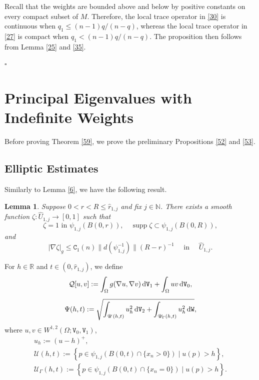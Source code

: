 \documentclass[reqno, 11pt, a4paper]{amsart}
\newtheorem{lemma}[theorem]{Lemma}
\numberwithin{equation}{section}
\newcommand{\ops}{\mathcal{Q}}
\newcommand{\womd}{W^{1,2} (\Omega ; \mathtt{V} _0 , \mathtt{V} _1)}
\newcommand{\spt}{\operatorname{supp}}
\newcommand{\dwv}{\textnormal{d} \mathtt{V}}
\newcommand{\dww}{\textnormal{d} \mathtt{W}}
\newcommand{\pvr}{p}
\newcommand{\qxp}{q}
\newcommand{\cen}{\mathtt{C}}
\newcommand{\bnorm}{\boldsymbol{\|}}
\begin{document}
Recall that the weights are bounded above and below by positive constants on every compact subset of \(M\). Therefore, the local trace operator in \eqref{30} is continuous when $\qxp_1\leq (n-1)\qxp/(n-\qxp)$,
  whereas the local trace operator in \eqref{27} is compact when $\qxp_1<(n-1)\qxp/(n-\qxp)$. The proposition then follows from Lemma \ref{25} and \eqref{35}.


\begin{flushright}
$\square$
\end{flushright}


\section{Principal Eigenvalues with Indefinite Weights}\label{143}



Before proving Theorem \ref{59}, we prove the preliminary Propositions \ref{52} and \ref{53}.

\subsection{Elliptic Estimates} 

Similarly to Lemma \ref{6}, we have the following result.
\begin{lemma} \label{153}
Suppose $0<r<R\leq \hat r _{1,j}$ and fix $j\in \mathbb{N}$. There exists a smooth function $\zeta  : \hat U  _{1,j} \rightarrow [0,1]$ such that  
$$
\zeta  = 1 \text { in } \psi _{1,j} (B(0,r)), \quad   \spt \zeta  \subset \psi _{1,j} (B(0,R)),
$$ 
and 
$$
|\nabla \zeta  | _g \leq \cen _1(n)\bnorm d (\psi _{1,j}^{-1}) \bnorm  (R-r)^{-1} \quad \text { in } \quad \hat  U _{1,j}.
$$ 
\end{lemma}



For $h \in \mathbb{R}$ and $t\in (0,\hat r_{1,j})$, we define
\begin{gather*}
\ops [u, v] :=\int  _{\Omega}    g(  \nabla u , \nabla v ) \, \dwv _{1}  + \int  _{\Omega}  u v  \,   \dwv _{0} ,\\[5pt]
\Psi (h ,t) := \sqrt{\int _{ \mathscr{U}(h ,t) } u_{ h }  ^2  \, \dwv _2 + \int _{ \mathscr{U}_{\Gamma }  (h ,t)  } u_{ h } ^2   \, \dww },
\end{gather*}
where $u,v\in \womd  $,
\begin{gather*}
u_{h}  := (u-h )^+,\\[5pt]
\mathscr{U}(h ,t) := \left\{\pvr \in \psi _{1,j} (  B(0,t)\cap \{x_n >0\} ) \mid u(\pvr) > h  \right\} , \\[5pt]
 \mathscr{U}_{ \Gamma } (h ,t) := \left\{ \pvr \in \psi _{1,j} (  B(0,t)\cap \{x_n =0\} ) \mid u(\pvr) > h  \right\}.  
\end{gather*}
\end{document}
